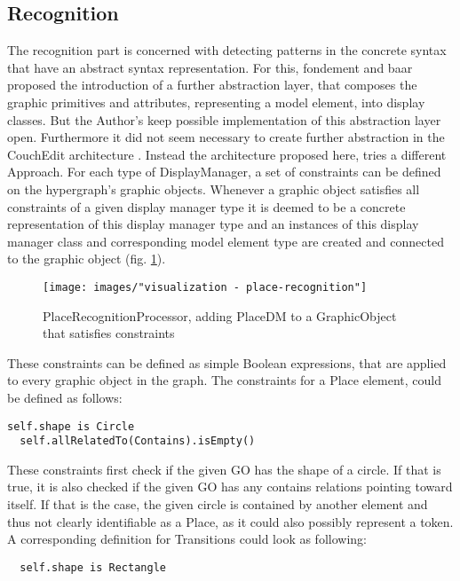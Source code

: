 \subsection{Recognition}
The recognition part is concerned with detecting patterns in the concrete syntax that have an abstract syntax representation. For this, fondement and baar proposed the introduction of a further abstraction layer, that composes the graphic primitives and attributes, representing a model element, into display classes. But the Author's keep possible implementation of this abstraction layer open. Furthermore it did not seem necessary to create further abstraction in the CouchEdit architecture . Instead the architecture proposed here, tries a different Approach. For each type of DisplayManager, a set of constraints can be defined on the hypergraph's graphic objects. Whenever a graphic object satisfies all constraints of a given display manager type it is deemed to be a concrete representation of this display manager type and an instances of this display manager class and corresponding model element type are created and connected to the graphic object (fig. \ref{fig:place-recognition}). 

\begin{figure}
  \centering
  \texttt{[image: images/"visualization - place-recognition"]}
  \caption{PlaceRecognitionProcessor, adding PlaceDM to a GraphicObject that satisfies constraints}
  \label{fig:place-recognition}
\end{figure}

These constraints can be defined as simple Boolean expressions, that are applied to every graphic object in the graph. The constraints for a Place element, could be defined as follows: 

\begin{lstlisting}[language=OCL]
  self.shape is Circle
  self.allRelatedTo(Contains).isEmpty()
\end{lstlisting} 

These constraints first check if the given GO has the shape of a circle. If that is true, it is also checked if the given GO has any contains relations pointing toward itself. If that is the case, the given circle is contained by another element and thus not clearly identifiable as a Place, as it could also possibly represent a token. A corresponding definition for Transitions could look as following: 

\begin{lstlisting}
  self.shape is Rectangle
\end{lstlisting}

